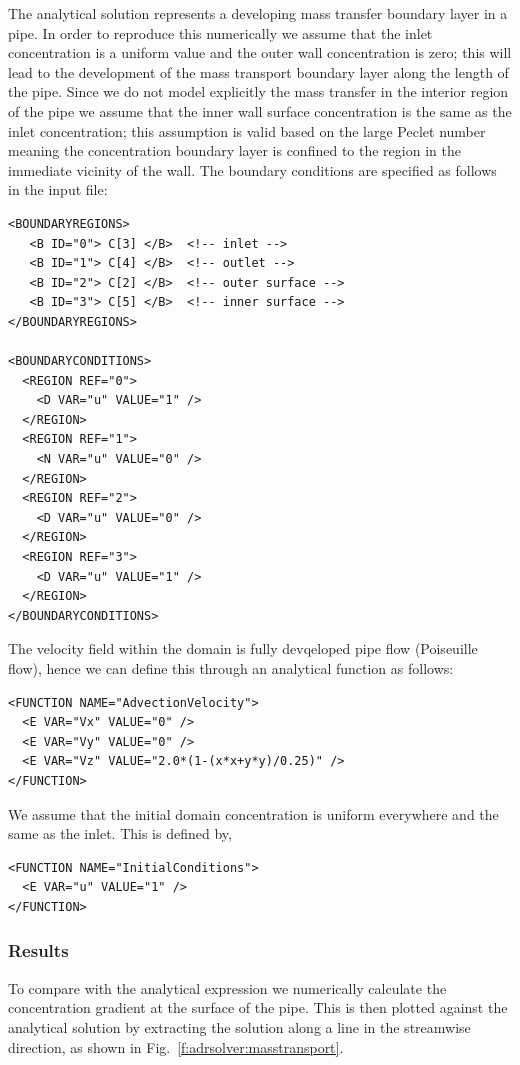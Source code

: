 The analytical solution represents a developing mass transfer boundary layer in
a pipe. In order to reproduce this numerically we assume that the inlet
concentration is a uniform value and the outer wall concentration is zero; this
will lead to the development of the mass transport boundary layer along the
length of the pipe. Since we do not model explicitly the mass transfer in the
interior region of the pipe we assume that the inner wall surface concentration
is the same as the inlet concentration; this assumption is valid based on the
large Peclet number meaning the concentration boundary layer is confined to the
region in the immediate vicinity of the wall. The boundary conditions are
specified as follows in the input file:
\begin{lstlisting}[style=XMLStyle]
<BOUNDARYREGIONS>
   <B ID="0"> C[3] </B>  <!-- inlet -->
   <B ID="1"> C[4] </B>  <!-- outlet -->
   <B ID="2"> C[2] </B>  <!-- outer surface -->
   <B ID="3"> C[5] </B>  <!-- inner surface -->
</BOUNDARYREGIONS>

<BOUNDARYCONDITIONS>
  <REGION REF="0">
    <D VAR="u" VALUE="1" />
  </REGION>
  <REGION REF="1">
    <N VAR="u" VALUE="0" />
  </REGION>
  <REGION REF="2">
    <D VAR="u" VALUE="0" />
  </REGION>
  <REGION REF="3">
    <D VAR="u" VALUE="1" />
  </REGION>
</BOUNDARYCONDITIONS>
\end{lstlisting}

The velocity field within the domain is fully devqeloped pipe flow (Poiseuille
flow), hence we can define this through an analytical function as follows:
\begin{lstlisting}[style=XMLStyle]
<FUNCTION NAME="AdvectionVelocity">
  <E VAR="Vx" VALUE="0" />
  <E VAR="Vy" VALUE="0" />
  <E VAR="Vz" VALUE="2.0*(1-(x*x+y*y)/0.25)" />
</FUNCTION>
\end{lstlisting}

We assume that the initial domain concentration is uniform everywhere and the
same as the inlet. This is defined by, 
\begin{lstlisting}[style=XMLStyle]
<FUNCTION NAME="InitialConditions">
  <E VAR="u" VALUE="1" />
</FUNCTION>
\end{lstlisting}

\subsubsection{Results}
To compare with the analytical expression we numerically calculate the
concentration gradient at the surface of the pipe. This is then plotted against
the analytical solution by extracting the solution along a line in the
streamwise direction, as shown in Fig.~\ref{f:adrsolver:masstransport}.

